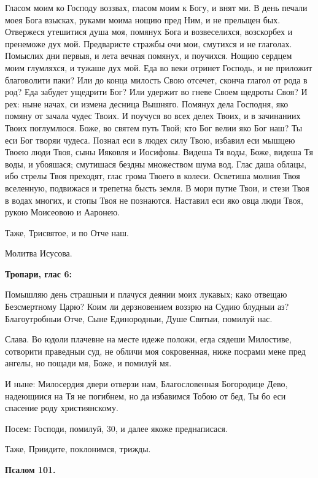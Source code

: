 Гласом моим ко Господу воззвах, гласом моим к Богу, и внят ми. В день печали моея Бога взысках, руками моима нощию пред Ним, и не прельщен бых. Отвержеся утешитися душа моя, помянух Бога и возвеселихся, возскорбех и пренеможе дух мой. Предваристе стражбы очи мои, смутихся и не глаголах. Помыслих дни первыя, и лета вечная помянух, и поучихся. Нощию сердцем моим глумляхся, и тужаше дух мой. Еда во веки отринет Господь, и не приложит благоволити паки? Или до конца милость Свою отсечет, сконча глагол от рода в род? Еда забудет ущедрити Бог? Или удержит во гневе Своем щедроты Своя? И рех: ныне начах, си измена десница Вышняго. Помянух дела Господня, яко помяну от зачала чудес Твоих. И поучуся во всех делех Твоих, и в зачинаниих Твоих поглумлюся. Боже, во святем путь Твой; кто Бог велии яко Бог наш? Ты еси Бог творяи чудеса. Познал еси в людех силу Твою, избавил еси мышцею Твоею люди Твоя, сыны Ияковля и Иосифовы. Видеша Тя воды, Боже, видеша Тя воды, и убояшася; смутишася бездны множеством шума вод. Глас даша облацы, ибо стрелы Твоя преходят, глас грома Твоего в колеси. Осветиша молния Твоя вселенную, подвижася и трепетна бысть земля. В мори путие Твои, и стези Твоя в водах многих, и стопы Твоя не познаются. Наставил еси яко овца люди Твоя, рукою Моисеовою и Ааронею.

Таже, Трисвятое, и по Отче наш.

Молитва Исусова.


\medskip


\bfseries Тропари, глас 6:\normalfont{}\nopagebreak


Помышляю день страшныи и плачуся деянии моих лукавых; како отвещаю Безсмертному Царю? Коим ли дерзновением воззрю на Судию блудныи аз? Благоутробныи Отче, Сыне Единородныи, Душе Святыи, помилуй нас.

Слава. Во юдоли плачевне на месте идеже положи, егда сядеши Милостиве, сотворити праведныи суд, не обличи моя сокровенная, ниже посрами мене пред ангелы, но пощади мя, Боже, и помилуй мя.

И ныне: Милосердия двери отверзи нам, Благословенная Богородице Дево, надеющиися на Тя  не  погибнем, но да избавимся Тобою от бед, Ты бо еси спасение роду християнскому.

Посем: Господи, помилуй, 30, и далее якоже преднаписася.

Таже, Приидите, поклонимся, трижды.


\medskip


\bfseries Псалом 101.\normalfont{}\nopagebreak


